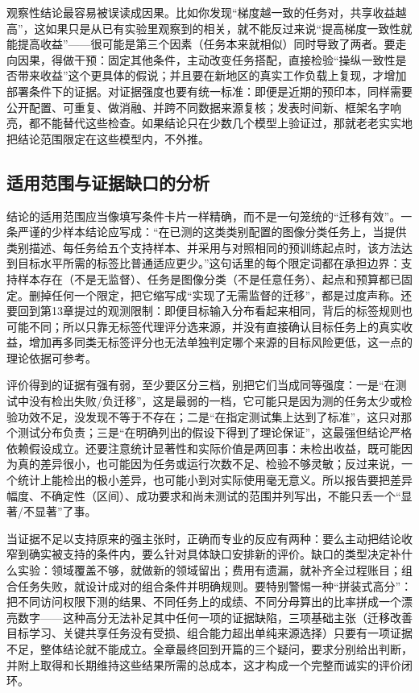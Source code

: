 观察性结论最容易被误读成因果。比如你发现“梯度越一致的任务对，共享收益越高”，这如果只是从已有实验里观察到的相关，就不能反过来说“提高梯度一致性就能提高收益”——很可能是第三个因素（任务本来就相似）同时导致了两者。要走向因果，得做干预：固定其他条件，主动改变任务搭配，直接检验“操纵一致性是否带来收益”这个更具体的假说；并且要在新地区的真实工作负载上复现，才增加部署条件下的证据。对证据强度也要有统一标准：即便是近期的预印本，同样需要公开配置、可重复、做消融、并跨不同数据来源复核；发表时间新、框架名字响亮，都不能替代这些检查。如果结论只在少数几个模型上验证过，那就老老实实地把结论范围限定在这些模型内，不外推。

\subsection{适用范围与证据缺口的分析}
\label{sec:ket-evaluation-limits}

结论的适用范围应当像填写条件卡片一样精确，而不是一句笼统的“迁移有效”。一条严谨的少样本结论应写成：“在已测的这类类别配置的图像分类任务上，当提供类别描述、每任务给五个支持样本、并采用与对照相同的预训练起点时，该方法达到目标水平所需的标签比普通适应更少。”这句话里的每个限定词都在承担边界：支持样本存在（不是无监督）、任务是图像分类（不是任意任务）、起点和预算都已固定。删掉任何一个限定，把它缩写成“实现了无需监督的迁移”，都是过度声称。还要回到第13章提过的观测限制：即便目标输入分布看起来相同，背后的标签规则也可能不同；所以只靠无标签代理评分选来源，并没有直接确认目标任务上的真实收益，增加再多同类无标签评分也无法单独判定哪个来源的目标风险更低，这一点的理论依据可参考。

评价得到的证据有强有弱，至少要区分三档，别把它们当成同等强度：一是“在测试中没有检出失败/负迁移”，这是最弱的一档，它可能只是因为测的任务太少或检验功效不足，没发现不等于不存在；二是“在指定测试集上达到了标准”，这只对那个测试分布负责；三是“在明确列出的假设下得到了理论保证”，这最强但结论严格依赖假设成立。还要注意统计显著性和实际价值是两回事：未检出收益，既可能因为真的差异很小，也可能因为任务或运行次数不足、检验不够灵敏；反过来说，一个统计上能检出的极小差异，也可能小到对实际使用毫无意义。所以报告要把差异幅度、不确定性（区间）、成功要求和尚未测试的范围并列写出，不能只丢一个“显著/不显著”了事。

当证据不足以支持原来的强主张时，正确而专业的反应有两种：要么主动把结论收窄到确实被支持的条件内，要么针对具体缺口安排新的评价。缺口的类型决定补什么实验：领域覆盖不够，就做新的领域留出；费用有遗漏，就补齐全过程账目；组合任务失败，就设计成对的组合条件并明确规则。要特别警惕一种“拼装式高分”：把不同访问权限下测的结果、不同任务上的成绩、不同分母算出的比率拼成一个漂亮数字——这种高分无法补足其中任何一项的证据缺陷，三项基础主张（迁移改善目标学习、关键共享任务没有受损、组合能力超出单纯来源选择）只要有一项证据不足，整体结论就不能成立。全章最终回到开篇的三个疑问，要求分别给出判断，并附上取得和长期维持这些结果所需的总成本，这才构成一个完整而诚实的评价闭环。

